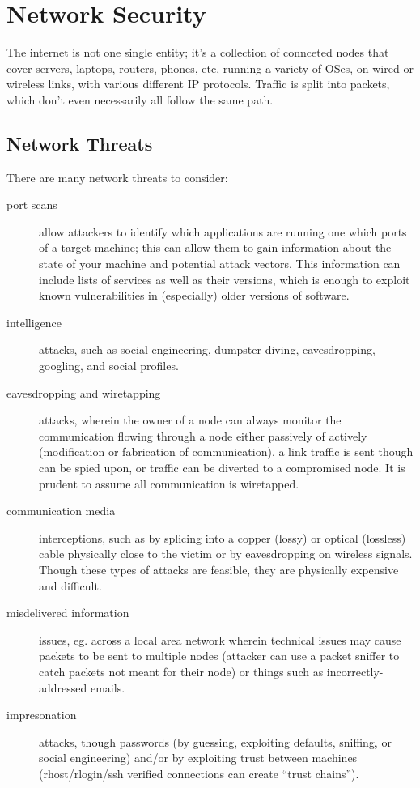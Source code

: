 \documentclass[12pt]{article}
\begin{document}

\section{Network Security}
The internet is not one single entity; it's a collection of connceted nodes that cover servers, laptops, routers, phones, etc, running a variety of OSes, on wired or wireless links, with various different IP protocols. Traffic is split into packets, which don't even necessarily all follow the same path.

\subsection{Network Threats}
There are many network threats to consider:
\begin{description}
\item[port scans] allow attackers to identify which applications are running one which ports of a target machine; this can allow them to gain information about the state of your machine and potential attack vectors. This information can include lists of services as well as their versions, which is enough to exploit known vulnerabilities in (especially) older versions of software.
\item[intelligence] attacks, such as social engineering, dumpster diving, eavesdropping, googling, and social profiles.
\item[eavesdropping and wiretapping] attacks, wherein the owner of a node can always monitor the communication flowing through a node either passively of actively (modification or fabrication of communication), a link traffic is sent though can be spied upon, or traffic can be diverted to a compromised node. It is prudent to assume all communication is wiretapped.
\item[communication media] interceptions, such as by splicing into a copper (lossy) or optical (lossless) cable physically close to the victim or by eavesdropping on wireless signals. Though these types of attacks are feasible, they are physically expensive and difficult.
\item[misdelivered information] issues, eg. across a local area network wherein technical issues may cause packets to be sent to multiple nodes (attacker can use a packet sniffer to catch packets not meant for their node) or things such as incorrectly-addressed emails.
\item[impresonation] attacks, though passwords (by guessing, exploiting defaults, sniffing, or social engineering) and/or by exploiting trust between machines (rhost/rlogin/ssh verified connections can create ``trust chains'').

\end{description}
\end{document}
